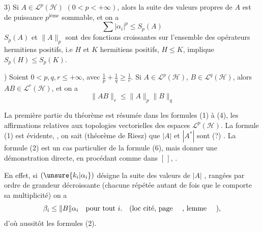 3) Si $A\in\mathcal L^p(\mathcal H)$ $(0<p<+\infty)$, alors la suite
des valeurs propres  de $A$ est de puissance
$p^{\mathrm{ième}}$ sommable, et on a
\[
\sum|\alpha_i|^p\leq S_p(A)\tag*{(5)}
\]
$S_p(A)$ et $\|A\|_p$ sont des fonctions croissantes
sur l'ensemble des opérateurs hermitiens
positifs, i.e $H$ et $K$ hermitiens positifs, $H\leq K$,
implique $S_p(H)\leq S_p(K)$.

) Soient $0<p,q,r\leq+\infty$, avec $\frac{1}{p}+\frac{1}{q}\geq\frac{1}{r}$. Si 
$A\in\mathcal L^p(\mathcal H)$, $B\in\mathcal L^q(\mathcal H)$, alors $AB\in\mathcal L^r(\mathcal H)$, et on a
\[
\|AB\|_r\leq\|A\|_p\|B\|_q\tag*{(6)}
\]

La première partie du théorème est résumée dans les
formules (1) à (4),   les affirmations relatives
aux topologies vectorielles des espaces $\mathcal L^p(\mathcal H)$.
La formule (1) est évidente,  
 , on sait (théorème
de Riesz) que $|A|$ et $|A^*|$ sont  
(?) . La formule (2) est un cas
particulier de la formule (6), mais  
donner une démonstration 
directe, en procédant comme dans $[\,]$, .

En effet, si $(\unsure{k_i|\alpha_i})$  désigne la
suite des valeurs  de  $|A|$
 ,
rangées par ordre de grandeur
décroissante (chacune répétée autant de fois
que le comporte sa multiplicité) on a
\[
\beta_i\leq\|B\|\alpha_i\quad\text{pour tout }i.\quad(\text{loc cité, page \quad, lemme \quad}),
\]
d'où aussitôt les formules (2).

